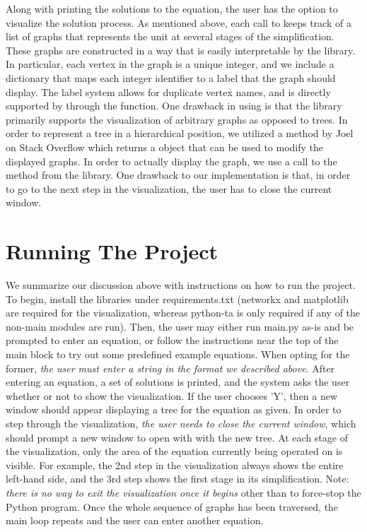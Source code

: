 \documentclass[11pt]{article}
\begin{document}
Along with printing the solutions to the equation, the user has the option to visualize the solution process. As mentioned above, each call to  keeps track of a list of graphs that represents the unit at several stages of the simplification. These graphs are constructed in a way that is easily interpretable by the  library. In particular, each vertex in the graph is a unique integer, and we include a dictionary that maps each integer identifier to a label that the graph should display. The label system allows for duplicate vertex names, and is directly supported by  through the  function. One drawback in using  is that the library primarily supports the visualization of arbitrary graphs as opposed to trees. In order to represent a tree in a hierarchical position, we utilized a method by Joel on Stack Overflow which returns a  object that can be used to modify the displayed graphs. In order to actually display the graph, we use a call to the  method from the  library. One drawback to our implementation is that, in order to go to the next step in the visualization, the user has to close the current window.

\section*{Running The Project}

We summarize our discussion above with instructions on how to run the project. To begin, install the libraries under requirements.txt (networkx and matplotlib are required for the visualization, whereas python-ta is only required if any of the non-main modules are run). Then, the user may either run main.py as-is and be prompted to enter an equation, or follow the instructions near the top of the main block to try out some predefined example equations. When opting for the former, \textit{the user must enter a string in the format we described above}. After entering an equation, a set of solutions is printed, and the system asks the user whether or not to show the visualization. If the user chooses 'Y', then a new window should appear displaying a tree for the equation as given. In order to step through the visualization, \textit{the user needs to close the current window}, which should prompt a new window to open with with the new tree. At each stage of the visualization, only the area of the equation currently being operated on is visible. For example, the 2nd step in the visualization always shows the entire left-hand side, and the 3rd step shows the first stage in its simplification. Note: \textit{there is no way to exit the visualization once it begins} other than to force-stop the Python program. Once the whole sequence of graphs has been traversed, the main loop repeats and the user can enter another equation.
\end{document}

